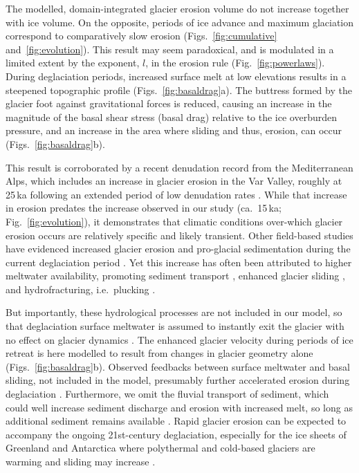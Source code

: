 \documentclass[esurf, manuscript]{copernicus}
\begin{document}
    The modelled, domain-integrated glacier erosion volume do not increase
    together with ice volume. On the opposite, periods of ice advance and
    maximum glaciation correspond to comparatively slow erosion
    (Figs.~\ref{fig:cumulative} and~\ref{fig:evolution}).
    This result may seem paradoxical, and is modulated in a limited extent by
    the exponent, $l$, in the erosion rule (Fig.~\ref{fig:powerlaws}).
    During deglaciation periods, increased surface melt at low elevations
    results in a steepened topographic profile (Figs.~\ref{fig:basaldrag}a).
    The buttress formed by the glacier foot against gravitational forces is
    reduced, causing an increase in the magnitude of the basal shear stress
    (basal drag) relative to the ice overburden pressure, and an increase in
    the area where sliding and thus, erosion, can occur
    (Figs.~\ref{fig:basaldrag}b).

    This result is corroborated by a recent denudation record from the
    Mediterranean Alps, which includes an increase in glacier erosion in the
    Var Valley, roughly at 25\,ka following an extended period of low
    denudation rates \citep{Mariotti.etal.2021}. While that increase in
    erosion predates the increase observed in our study (ca.~15\,ka;
    Fig.~\ref{fig:evolution}), it demonstrates that climatic conditions
    over-which glacier erosion occurs are relatively specific and likely
    transient. Other field-based studies have evidenced increased glacier
    erosion and pro-glacial sedimentation during the current deglaciation period
    \citep[e.g.,][]{Koppes.Montgomery.2009, Micheletti.Lane.2016,
    Lane.etal.2017, Bendixen.etal.2017}. Yet this increase has often been
    attributed to higher meltwater availability, promoting sediment transport
    \citep{Delaney.Adhikari.2020}, enhanced glacier sliding
    \citep{Herman.etal.2011}, and hydrofracturing, i.e.~plucking
    \citep{Hallet.1996, Ugelvig.etal.2018, Hildes.etal.2004}.

    But importantly, these hydrological processes are not included in our
    model, so that deglaciation surface meltwater is assumed to instantly exit
    the glacier with no effect on glacier dynamics \citep[cf.][for comparison]
    {Werder.etal.2013, Iverson.2012, Ugelvig.etal.2018}. The enhanced glacier
    velocity during periods of ice retreat is here modelled to result from
    changes in glacier geometry alone (Figs.~\ref{fig:basaldrag}b).
    Observed feedbacks between
    surface meltwater and basal sliding, not included in the model, presumably
    further accelerated erosion during deglaciation \citep{Herman.etal.2011}.
    Furthermore, we omit the fluvial transport of sediment, which could well
    increase sediment discharge and erosion with increased melt, so long as
    additional sediment remains available \citep{Delaney.Adhikari.2020}. Rapid
    glacier erosion can be expected to accompany the ongoing 21st-century
    deglaciation, especially for the ice sheets of Greenland and
    Antarctica where polythermal and cold-based glaciers are warming and
    sliding may increase \citep[e.g.,][]{Moon.etal.2012, Mouginot.etal.2014,
    Overeem.etal.2017}.
\end{document}
